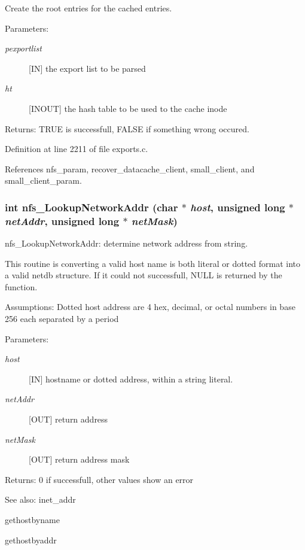 Create the root entries for the cached entries.

\begin{Desc}
\item[Parameters:]
\begin{description}
\item[{\em pexportlist}][IN] the export list to be parsed \item[{\em ht}][INOUT] the hash table to be used to the cache inode\end{description}
\end{Desc}
\begin{Desc}
\item[Returns:]TRUE is successfull, FALSE if something wrong occured. \end{Desc}


Definition at line 2211 of file exports.c.

References nfs\_\-param, recover\_\-datacache\_\-client, small\_\-client, and small\_\-client\_\-param.
\subsubsection{\setlength{\rightskip}{0pt plus 5cm}int nfs\_\-Lookup\-Network\-Addr (char $\ast$ {\em host}, unsigned long $\ast$ {\em net\-Addr}, unsigned long $\ast$ {\em net\-Mask})}\label{exports_8c_a69}


nfs\_\-Lookup\-Network\-Addr: determine network address from string.

This routine is converting a valid host name is both literal or dotted format into a valid netdb structure. If it could not successfull, NULL is returned by the function.

Assumptions: Dotted host address are 4 hex, decimal, or octal numbers in base 256 each separated by a period

\begin{Desc}
\item[Parameters:]
\begin{description}
\item[{\em host}][IN] hostname or dotted address, within a string literal. \item[{\em net\-Addr}][OUT] return address \item[{\em net\-Mask}][OUT] return address mask\end{description}
\end{Desc}
\begin{Desc}
\item[Returns:]0 if successfull, other values show an error\end{Desc}
\begin{Desc}
\item[See also:]inet\_\-addr 

gethostbyname 

gethostbyaddr \end{Desc}


